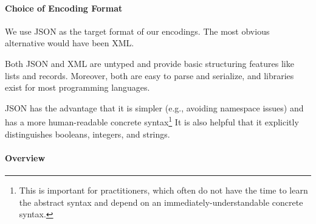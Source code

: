 
\paragraph{Choice of Encoding Format}
We use JSON as the target format of our encodings.
The most obvious alternative would have been XML.

Both JSON and XML are untyped and provide basic structuring features like lists and records.
Moreover, both are easy to parse and serialize, and libraries exist for most programming languages.

JSON has the advantage that it is simpler (e.g., avoiding namespace issues) and has a more human-readable concrete syntax\footnote{This is important for practitioners, which often do not have the time to learn the abstract syntax and depend on an immediately-understandable concrete syntax.}
It is also helpful that it explicitly distinguishes booleans, integers, and strings.

\paragraph{Overview}
